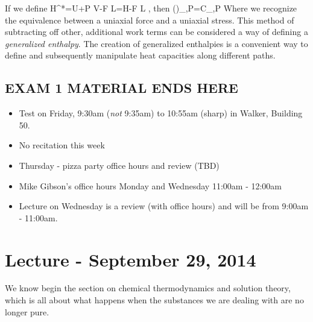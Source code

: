 \documentclass[12pt]{article}
\begin{document}
If we define 
\eqs H^*=U+P V-F L=H-F L\eqe
, then
\eqs \left(\right)_{\sigma ,P}=C_{\sigma ,P} \eqe
Where we recognize the equivalence between a uniaxial force
and a uniaxial stress. This method of subtracting off other, additional work terms can be considered a way of defining a \emph{generalized enthalpy}. The creation of generalized enthalpies is a convenient way to define and subsequently manipulate heat capacities along different paths.

\subsection{EXAM 1 MATERIAL ENDS HERE}
\begin{itemize}
\item Test on Friday, 9:30am (\emph{not} 9:35am) to 10:55am (sharp) in Walker, Building 50.
\item No recitation this week
\item Thursday - pizza party office hours and review (TBD)
\item Mike Gibson's office hours Monday and Wednesday 11:00am - 12:00am
\item Lecture on Wednesday is a review (with office hours) and will be from 9:00am - 11:00am.
\end{itemize}

\section{Lecture - September 29, 2014}
We know begin the section on chemical thermodynamics and solution theory, which is all about what happens when the substances we are dealing with are no longer pure. 
\end{document}
